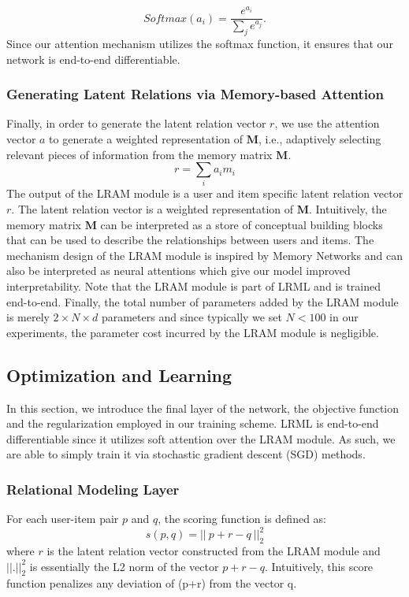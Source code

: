 \documentclass[sigconf]{acmart}
\begin{document}
\begin{equation}
 Softmax(a_i) = \frac{e^{a_i}}{\sum_{j}e^{a_j}}.
\end{equation}
Since our attention mechanism utilizes the softmax function, it ensures that our network is end-to-end differentiable. 
\subsubsection{Generating Latent Relations via Memory-based Attention}
Finally, in order to generate the latent relation vector $r$, we use the attention vector $a$ to generate a weighted representation of $\textbf{M}$, i.e., adaptively selecting relevant pieces of information from the memory matrix $\textbf{M}$.
\begin{equation}
r = \sum_{i} a_i m_i
\end{equation}
The output of the LRAM module is a user and item specific latent relation vector $r$. The latent relation vector is a weighted representation of $\textbf{M}$. Intuitively, the memory matrix $\textbf{M}$ can be interpreted as a store of conceptual building blocks that can be used to describe the relationships between users and items. The mechanism design of the LRAM module is inspired by Memory Networks and can also be interpreted as neural attentions which give our model improved interpretability. Note that the LRAM module is part of \textsc{LRML} and is trained end-to-end. Finally, the total number of parameters added by the LRAM module is merely $2 \times N \times d$ parameters and since typically we set $N<100$ in our experiments, the parameter cost incurred by the LRAM module is negligible.   
\subsection{Optimization and Learning}
In this section, we introduce the final layer of the network, the objective function and the regularization employed in our training scheme. \textsc{LRML} is end-to-end differentiable since it utilizes soft attention over the LRAM module. As such, we are able to simply train it via stochastic gradient descent (SGD) methods. 
\subsubsection{Relational Modeling Layer}
For each user-item pair $p$ and $q$, the scoring function is defined as:
\begin{equation}
s(p,q) = || \: p + r - q \: ||^{2}_{2} 
\end{equation}
where $r$ is the latent relation vector constructed from the LRAM module and $||.||^{2}_{2}$ is essentially the L2 norm of the vector $p+r-q$. Intuitively, this score function penalizes any deviation of (p+r) from the vector q.
\end{document}
